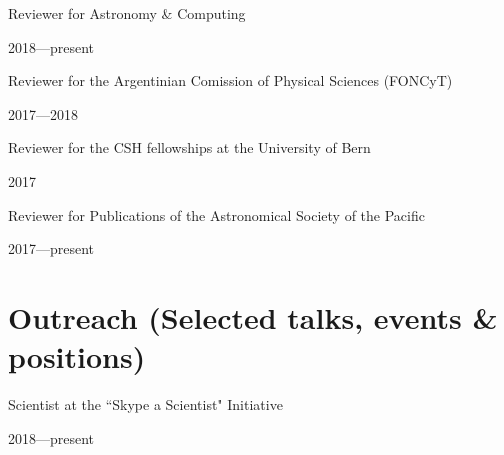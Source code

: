 \documentclass[11pt, a4paper]{article} %
\begin{document}
\begin{minipage}[t]{0.7\textwidth}
\begin{flushleft}%
  \setlength{\leftskip}{0.2cm}%
Reviewer for Astronomy \& Computing
\end{flushleft}
\end{minipage}
\begin{minipage}[t]{0.3\textwidth}
\hfill 2018---present
\end{minipage}

\begin{minipage}[t]{0.7\textwidth}
\begin{flushleft}%
  \setlength{\leftskip}{0.2cm}%
Reviewer for the Argentinian Comission of Physical Sciences (FONCyT)
\end{flushleft}
\end{minipage}
\begin{minipage}[t]{0.3\textwidth}
\hfill 2017---2018
\end{minipage}

\begin{minipage}[t]{0.7\textwidth}
\begin{flushleft}%
  \setlength{\leftskip}{0.2cm}%
Reviewer for the CSH fellowships at the University of Bern 
\end{flushleft}
\end{minipage}
\begin{minipage}[t]{0.3\textwidth}
\hfill 2017
\end{minipage}

\begin{minipage}[t]{0.7\textwidth}
\begin{flushleft}%
  \setlength{\leftskip}{0.2cm}%
Reviewer for Publications of the Astronomical Society of the Pacific 
\end{flushleft}
\end{minipage}
\begin{minipage}[t]{0.3\textwidth}
\hfill 2017---present
\end{minipage}

\section*{Outreach (Selected talks, events \& positions)}

\begin{minipage}[t]{0.7\textwidth}
\begin{flushleft}%
  \setlength{\leftskip}{0.2cm}%
Scientist at the ``Skype a Scientist" Initiative
\end{flushleft}
\end{minipage}
\begin{minipage}[t]{0.3\textwidth}
\hfill 2018---present
\end{minipage}
\end{document}
